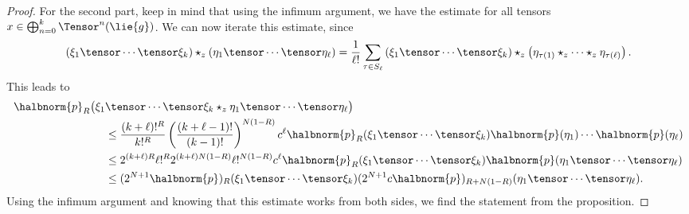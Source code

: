 \documentclass[
11pt,                          %
english                        %
]{article}
\begin{document}
\begin{proof}
	For the second part, keep in mind that using the infimum argument, we have the 
	estimate for all tensors $x \in \bigoplus_{n=0}^k \Tensor^n(\lie{g})$. We can now 
	iterate this estimate, since
	\begin{equation*}
		\left( \xi_1 \tensor \cdots \tensor \xi_k \right)
		\star_z
		\left( \eta_1 \tensor \cdots \tensor \eta_\ell \right)
		=
		\frac{1}{\ell!}
		\sum\limits_{\tau \in S_\ell}
		\left( \xi_1 \tensor \cdots \tensor \xi_k \right)
		\star_z
		\left( \eta_{\tau(1)} \star_z \cdots \star_z \eta_{\tau(\ell)} \right).
	\end{equation*}
	This leads to
	\begin{align*}
		\halbnorm{p}_R
		\big(
			\xi_1
		&	
			 \tensor \cdots \tensor \xi_k 
			 \star_z 
			 \eta_1 \tensor \cdots \tensor \eta_\ell
		\big)
		\\
		& \leq
		\frac{(k + \ell)!^R}{k!^R}
		\left(
			\frac{(k + \ell - 1)!}{(k - 1)!}
		\right)^{N (1 - R)}
		c^\ell
		\halbnorm{p}_R( \xi_1 \tensor \cdots \tensor \xi_k )
		\halbnorm{p}( \eta_1 ) \cdots \halbnorm{p} ( \eta_\ell )
		\\
		& \leq
		2^{(k + \ell) R}
		\ell!^R
		2^{(k + \ell) N (1 - R)}
		\ell!^{N (1 - R)}
		c^\ell
		\halbnorm{p}_R( \xi_1 \tensor \cdots \tensor \xi_k )
		\halbnorm{p}( \eta_1 \tensor \cdots \tensor \eta_\ell )
		\\
		& \leq
		(2^{N + 1} \halbnorm{p})_R
		( \xi_1 \tensor \cdots \tensor \xi_k )
		(2^{N + 1} c \halbnorm{p})_{R + N (1 - R)}
		( \eta_1 \tensor \cdots \tensor \eta_\ell ).
	\end{align*}
	Using the infimum argument and knowing that this estimate works from both sides,
	we find the statement from the proposition.
\end{proof}
\end{document}
